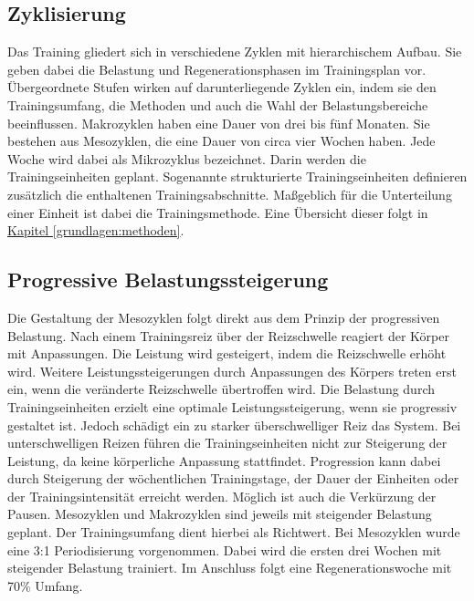 \subsection{Zyklisierung}
Das Training gliedert sich in verschiedene Zyklen mit hierarchischem Aufbau. Sie geben dabei die Belastung und Regenerationsphasen im Trainingsplan vor. Übergeordnete Stufen wirken auf darunterliegende Zyklen ein, indem sie den Trainingsumfang, die Methoden und auch die Wahl der Belastungsbereiche beeinflussen. \cite[283]{Trainingswissenschaft}
Makrozyklen haben eine Dauer von drei bis fünf Monaten. Sie bestehen aus Mesozyklen, die eine Dauer von circa vier Wochen haben. Jede Woche wird dabei als Mikrozyklus bezeichnet. Darin werden die Trainingseinheiten geplant. Sogenannte strukturierte Trainingseinheiten definieren zusätzlich die enthaltenen Trainingsabschnitte. Maßgeblich für die Unterteilung einer Einheit ist dabei die Trainingsmethode. Eine Übersicht dieser folgt in \hyperref[grundlagen:methoden]{Kapitel \ref{grundlagen:methoden}}.

\subsection{Progressive Belastungssteigerung}
Die Gestaltung der Mesozyklen folgt direkt aus dem Prinzip der progressiven Belastung. Nach einem Trainingsreiz über der Reizschwelle reagiert der Körper mit Anpassungen. Die Leistung wird gesteigert, indem die Reizschwelle erhöht wird. Weitere Leistungssteigerungen durch Anpassungen des Körpers treten erst ein, wenn die veränderte Reizschwelle übertroffen wird. Die Belastung durch Trainingseinheiten erzielt eine optimale Leistungssteigerung, wenn sie progressiv gestaltet ist. Jedoch schädigt ein zu starker überschwelliger Reiz das System. Bei unterschwelligen Reizen führen die Trainingseinheiten nicht zur Steigerung der Leistung, da keine körperliche Anpassung stattfindet. \cite[58]{Seidenspinner2005} Progression kann dabei durch Steigerung der wöchentlichen Trainingstage, der Dauer der Einheiten oder der Trainingsintensität erreicht werden. Möglich ist auch die Verkürzung der Pausen.\newline 
Mesozyklen und Makrozyklen sind jeweils mit steigender Belastung geplant. Der Trainingsumfang dient hierbei als Richtwert. \cite[60-61]{Radsporttraining} Bei Mesozyklen wurde eine 3:1 Periodisierung vorgenommen. Dabei wird die ersten drei Wochen mit steigender Belastung trainiert. Im Anschluss folgt eine Regenerationswoche mit 70\% Umfang.

